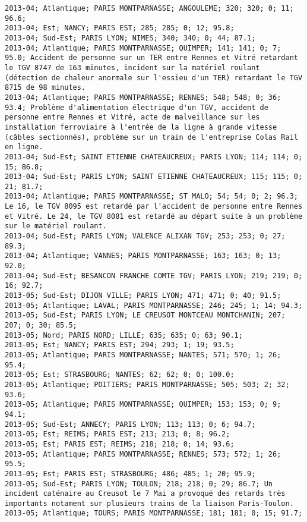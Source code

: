 \documentclass{article}
\begin{document}
\begin{Verbatim}[commandchars=\\\{\}]
2013-04; Atlantique; PARIS MONTPARNASSE; ANGOULEME; 320; 320; 0; 11; 96.6; 
2013-04; Est; NANCY; PARIS EST; 285; 285; 0; 12; 95.8; 
2013-04; Sud-Est; PARIS LYON; NIMES; 340; 340; 0; 44; 87.1; 
2013-04; Atlantique; PARIS MONTPARNASSE; QUIMPER; 141; 141; 0; 7; 95.0; Accident de personne sur un TER entre Rennes et Vitré retardant le TGV 8747 de 163 minutes, incident sur la matériel roulant (détection de chaleur anormale sur l'essieu d'un TER) retardant le TGV 8715 de 98 minutes.
2013-04; Atlantique; PARIS MONTPARNASSE; RENNES; 548; 548; 0; 36; 93.4; Problème d'alimentation électrique d'un TGV, accident de personne entre Rennes et Vitré, acte de malveillance sur les installation ferroviaire à l'entrée de la ligne à grande vitesse (câbles sectionnés), problème sur un train de l'entreprise Colas Rail en ligne.
2013-04; Sud-Est; SAINT ETIENNE CHATEAUCREUX; PARIS LYON; 114; 114; 0; 15; 86.8; 
2013-04; Sud-Est; PARIS LYON; SAINT ETIENNE CHATEAUCREUX; 115; 115; 0; 21; 81.7; 
2013-04; Atlantique; PARIS MONTPARNASSE; ST MALO; 54; 54; 0; 2; 96.3; Le 16, le TGV 8095 est retardé par l'accident de personne entre Rennes et Vitré. Le 24, le TGV 8081 est retardé au départ suite à un problème sur le matériel roulant.
2013-04; Sud-Est; PARIS LYON; VALENCE ALIXAN TGV; 253; 253; 0; 27; 89.3; 
2013-04; Atlantique; VANNES; PARIS MONTPARNASSE; 163; 163; 0; 13; 92.0; 
2013-04; Sud-Est; BESANCON FRANCHE COMTE TGV; PARIS LYON; 219; 219; 0; 16; 92.7; 
2013-05; Sud-Est; DIJON VILLE; PARIS LYON; 471; 471; 0; 40; 91.5; 
2013-05; Atlantique; LAVAL; PARIS MONTPARNASSE; 246; 245; 1; 14; 94.3; 
2013-05; Sud-Est; PARIS LYON; LE CREUSOT MONTCEAU MONTCHANIN; 207; 207; 0; 30; 85.5; 
2013-05; Nord; PARIS NORD; LILLE; 635; 635; 0; 63; 90.1; 
2013-05; Est; NANCY; PARIS EST; 294; 293; 1; 19; 93.5; 
2013-05; Atlantique; PARIS MONTPARNASSE; NANTES; 571; 570; 1; 26; 95.4; 
2013-05; Est; STRASBOURG; NANTES; 62; 62; 0; 0; 100.0; 
2013-05; Atlantique; POITIERS; PARIS MONTPARNASSE; 505; 503; 2; 32; 93.6; 
2013-05; Atlantique; PARIS MONTPARNASSE; QUIMPER; 153; 153; 0; 9; 94.1; 
2013-05; Sud-Est; ANNECY; PARIS LYON; 113; 113; 0; 6; 94.7; 
2013-05; Est; REIMS; PARIS EST; 213; 213; 0; 8; 96.2; 
2013-05; Est; PARIS EST; REIMS; 218; 218; 0; 14; 93.6; 
2013-05; Atlantique; PARIS MONTPARNASSE; RENNES; 573; 572; 1; 26; 95.5; 
2013-05; Est; PARIS EST; STRASBOURG; 486; 485; 1; 20; 95.9; 
2013-05; Sud-Est; PARIS LYON; TOULON; 218; 218; 0; 29; 86.7; Un incident caténaire au Creusot le 7 Mai a provoqué des retards très importants notament sur plusieurs trains de la liaison Paris-Toulon.
2013-05; Atlantique; TOURS; PARIS MONTPARNASSE; 181; 181; 0; 15; 91.7; 

\end{Verbatim}
\end{document}
